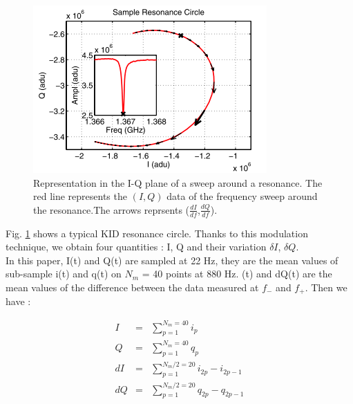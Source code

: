 \begin{figure}[h]
\center
	\includegraphics[scale=0.5]{Figures/resonance-circle.png}
	\caption{Representation in the I-Q plane of a sweep around a resonance. The red line represents the $(I,Q)$ data of the frequency sweep around the resonance.The arrows reprsents ($\frac{dI}{df}$,$\frac{dQ}{df}$). \citep{2013A&A...551L..12C}}
	\label{circle-iq}
\end{figure}

Fig. \ref{circle-iq} shows a typical KID resonance circle. Thanks to this
modulation technique, we obtain four quantities : I, Q and their variation
$\delta I$, $\delta Q$.\\ In this paper, I(t) and Q(t) are sampled at 22 Hz,
they are the mean values of sub-sample i(t) and q(t) on $N_{m}$ = 40 points at
880 Hz. \di(t) and dQ(t) are the mean values of the difference between the data
measured at $f_{-}$ and $f_{+}$. Then we have :


\begin{eqnarray}
I  &=& \sum^{N_{m}=40}_{p=1} i_{p}\\
Q  &=& \sum^{N_{m}=40}_{p=1} q_{p}\\
dI &=& \sum^{N_{m}/2=20}_{p=1} i_{2p} - i_{2p-1}\\
dQ &=& \sum^{N_{m}/2=20}_{p=1} q_{2p} - q_{2p-1}
\end{eqnarray}

